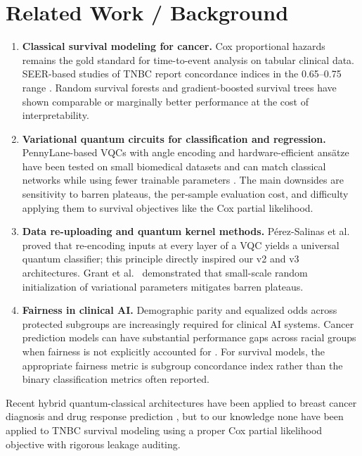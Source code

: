 \documentclass[12pt, letterpaper]{article}
\begin{document}
\section{Related Work / Background}

\begin{enumerate}[label=\arabic*.]
    \item \textbf{Classical survival modeling for cancer.} Cox proportional hazards \citep{cox1972} remains the gold standard for time-to-event analysis on tabular clinical data. SEER-based studies of TNBC report concordance indices in the 0.65--0.75 range \citep{huang2022, qiu2024}. Random survival forests and gradient-boosted survival trees have shown comparable or marginally better performance at the cost of interpretability.

    \item \textbf{Variational quantum circuits for classification and regression.} PennyLane-based VQCs with angle encoding and hardware-efficient ans\"{a}tze have been tested on small biomedical datasets and can match classical networks while using fewer trainable parameters \citep{schuld2021, benedetti2019}. The main downsides are sensitivity to barren plateaus, the per-sample evaluation cost, and difficulty applying them to survival objectives like the Cox partial likelihood.

    \item \textbf{Data re-uploading and quantum kernel methods.} P\'{e}rez-Salinas et al.\ \citep{perez2020} proved that re-encoding inputs at every layer of a VQC yields a universal quantum classifier; this principle directly inspired our v2 and v3 architectures. Grant et al.\ \citep{grant2019} demonstrated that small-scale random initialization of variational parameters mitigates barren plateaus.

    \item \textbf{Fairness in clinical AI.} Demographic parity and equalized odds across protected subgroups are increasingly required for clinical AI systems. Cancer prediction models can have substantial performance gaps across racial groups when fairness is not explicitly accounted for \citep{chen2023, raza2024}. For survival models, the appropriate fairness metric is subgroup concordance index rather than the binary classification metrics often reported.
\end{enumerate}

Recent hybrid quantum-classical architectures have been applied to breast cancer diagnosis \citep{xiang2024} and drug response prediction \citep{sagingalieva2022}, but to our knowledge none have been applied to TNBC survival modeling using a proper Cox partial likelihood objective with rigorous leakage auditing.
\end{document}
